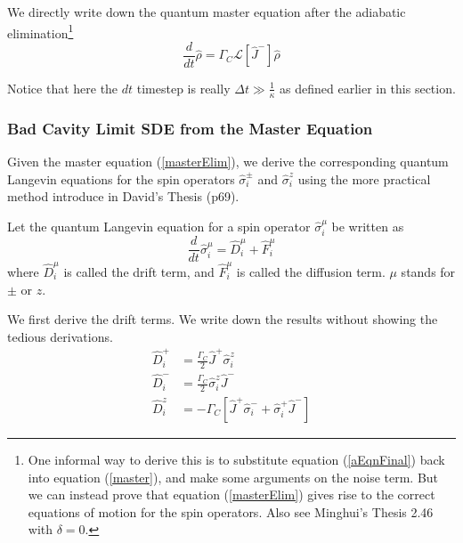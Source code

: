 \documentclass{article}
\newcommand{\gc}{\Gamma_C}
\newcommand{\lindblad}{\mathcal{L}}
\begin{document}

We directly write down the quantum master equation after the adiabatic elimination\footnote{One informal way to derive this is to substitute equation (\ref{aEqnFinal}) back into equation (\ref{master}), and make some arguments on the noise term. But we can instead prove that equation (\ref{masterElim}) gives rise to the correct equations of motion for the spin operators. Also see Minghui's Thesis 2.46 with $\delta=0$.}
\begin{equation}
\label{masterElim}
\frac{d}{dt}\hat{\rho}=\gc\lindblad[\hat{J}^-]\hat{\rho}
\end{equation}

Notice that here the $dt$ timestep is really $\Delta t \gg \frac{1}{\kappa}$ as defined earlier in this section.

\subsubsection{Bad Cavity Limit SDE from the Master Equation}
Given the master equation (\ref{masterElim}), we derive the corresponding quantum Langevin equations for the spin operators $\hat{\sigma}_i^\pm$ and $\hat{\sigma}_i^z$ using the more practical method introduce in David's Thesis (p69).

Let the quantum Langevin equation for a spin operator $\hat{\sigma}_i^\mu$ be written as
\begin{equation}
    \frac{d}{dt}\hat{\sigma}_i^\mu = \hat{D}_i^\mu+\hat{F}_i^\mu
\end{equation}
where $\hat{D}_i^\mu$ is called the drift term, and $\hat{F}_i^\mu$ is called the diffusion term. $\mu$ stands for $\pm$ or $z$.

We first derive the drift terms. We write down the results without showing the tedious derivations.
\begin{align}
    \label{drift;cn;+-}
    \hat{D}_i^+ & = \frac{\gc}{2} \hat{J}^+ \hat{\sigma}_i^z\\
    \hat{D}_i^- & = \frac{\gc}{2} \hat{\sigma}_i^z\hat{J}^- \\
    \hat{D}_i^z & = -\gc \left[\hat{J}^+ \hat{\sigma}_i^- + \hat{\sigma}_i^+\hat{J}^-\right]
\end{align}
\end{document}

